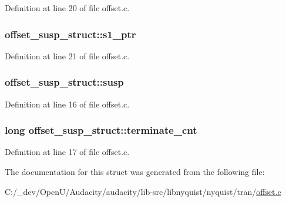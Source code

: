 Definition at line 20 of file offset.\+c.

\subsubsection[{\texorpdfstring{s1\+\_\+ptr}{s1_ptr}}]{ offset\+\_\+susp\+\_\+struct\+::s1\+\_\+ptr}\hypertarget{structoffset__susp__struct_a86b3a0c080484ac279c8634895bea579}{}\label{structoffset__susp__struct_a86b3a0c080484ac279c8634895bea579}


Definition at line 21 of file offset.\+c.

\subsubsection[{\texorpdfstring{susp}{susp}}]{ offset\+\_\+susp\+\_\+struct\+::susp}\hypertarget{structoffset__susp__struct_a466f7f6ffc41d04abefb5c11985adb6c}{}\label{structoffset__susp__struct_a466f7f6ffc41d04abefb5c11985adb6c}


Definition at line 16 of file offset.\+c.

\subsubsection[{\texorpdfstring{terminate\+\_\+cnt}{terminate_cnt}}]{\setlength{\rightskip}{0pt plus 5cm}long offset\+\_\+susp\+\_\+struct\+::terminate\+\_\+cnt}\hypertarget{structoffset__susp__struct_a622c7be67f53965b42ec6da4cd5f704f}{}\label{structoffset__susp__struct_a622c7be67f53965b42ec6da4cd5f704f}


Definition at line 17 of file offset.\+c.



The documentation for this struct was generated from the following file\+:\begin{DoxyCompactItemize}
\item 
C\+:/\+\_\+dev/\+Open\+U/\+Audacity/audacity/lib-\/src/libnyquist/nyquist/tran/\hyperlink{offset_8c}{offset.\+c}\end{DoxyCompactItemize}
